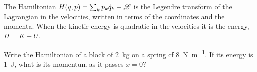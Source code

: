 \begin{keyidea}
The Hamiltonian $H(q, p) = \sum_k p_k\dot{q}_k - \mathscr{L}$ is the Legendre
transform of the Lagrangian in the velocities, written in terms of the
coordinates and the momenta. When the kinetic energy is quadratic in the
velocities it is the energy, $H = K + U$.
\end{keyidea}

\begin{selfcheck}
Write the Hamiltonian of a block of \SI{2}{\kilogram} on a spring of
\SI{8}{\newton\per\metre}. If its energy is \SI{1}{\joule}, what is its
momentum as it passes $x = 0$?
\end{selfcheck}
